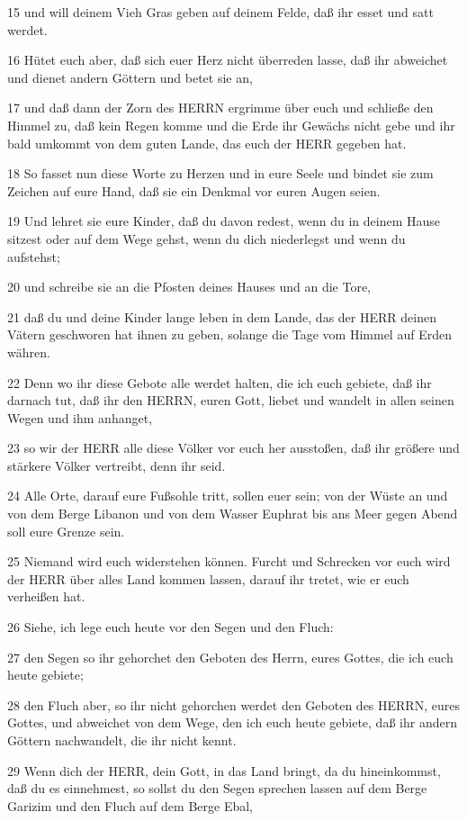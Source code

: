 \par 15 und will deinem Vieh Gras geben auf deinem Felde, daß ihr esset und satt werdet.
\par 16 Hütet euch aber, daß sich euer Herz nicht überreden lasse, daß ihr abweichet und dienet andern Göttern und betet sie an,
\par 17 und daß dann der Zorn des HERRN ergrimme über euch und schließe den Himmel zu, daß kein Regen komme und die Erde ihr Gewächs nicht gebe und ihr bald umkommt von dem guten Lande, das euch der HERR gegeben hat.
\par 18 So fasset nun diese Worte zu Herzen und in eure Seele und bindet sie zum Zeichen auf eure Hand, daß sie ein Denkmal vor euren Augen seien.
\par 19 Und lehret sie eure Kinder, daß du davon redest, wenn du in deinem Hause sitzest oder auf dem Wege gehst, wenn du dich niederlegst und wenn du aufstehst;
\par 20 und schreibe sie an die Pfosten deines Hauses und an die Tore,
\par 21 daß du und deine Kinder lange leben in dem Lande, das der HERR deinen Vätern geschworen hat ihnen zu geben, solange die Tage vom Himmel auf Erden währen.
\par 22 Denn wo ihr diese Gebote alle werdet halten, die ich euch gebiete, daß ihr darnach tut, daß ihr den HERRN, euren Gott, liebet und wandelt in allen seinen Wegen und ihm anhanget,
\par 23 so wir der HERR alle diese Völker vor euch her ausstoßen, daß ihr größere und stärkere Völker vertreibt, denn ihr seid.
\par 24 Alle Orte, darauf eure Fußsohle tritt, sollen euer sein; von der Wüste an und von dem Berge Libanon und von dem Wasser Euphrat bis ans Meer gegen Abend soll eure Grenze sein.
\par 25 Niemand wird euch widerstehen können. Furcht und Schrecken vor euch wird der HERR über alles Land kommen lassen, darauf ihr tretet, wie er euch verheißen hat.
\par 26 Siehe, ich lege euch heute vor den Segen und den Fluch:
\par 27 den Segen so ihr gehorchet den Geboten des Herrn, eures Gottes, die ich euch heute gebiete;
\par 28 den Fluch aber, so ihr nicht gehorchen werdet den Geboten des HERRN, eures Gottes, und abweichet von dem Wege, den ich euch heute gebiete, daß ihr andern Göttern nachwandelt, die ihr nicht kennt.
\par 29 Wenn dich der HERR, dein Gott, in das Land bringt, da du hineinkommst, daß du es einnehmest, so sollst du den Segen sprechen lassen auf dem Berge Garizim und den Fluch auf dem Berge Ebal,
